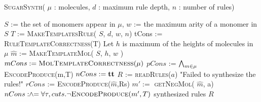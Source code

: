 \begin{algorithm}[t]
  \caption{ \textsc{SugarSynth}( $\mu$ : molecules, $d$ : maximum rule depth, $n$ : number of rules)}
  \label{alg:sugar-synth}
  \begin{algorithmic}[1]
  \State $S$ := the set of monomers appear in $\mu$, $w$ := the maximum arity of a monomer in $S$
  \State $T$ := \textsc{MakeTemplatesRule}( $S$, $d$, $w$, $n$)
  \label{line:createRtemp}
  \State tCons := \textsc{RuleTemplateCorrectness}(T)
  \label{line:ruleCorr}
  \State Let $h$ is maximum of the heights of molecules in $\mu$
  \State $\hat{m}$ := \textsc{MakeTemplateMol}( $S$, $h$, $w$ )
  \label{line:createMtemp}
  \State $mCons := \textsc{MolTemplateCorrectness}(\mu)$
  \label{line:molCorr}
  \State $pCons$ := $\bigwedge_{m \in \mu}$ \textsc{EncodeProduce}(m,T)
    \label{line:molenc}
  \State $nCons := \mathbf{tt}$
  \While{$\ltrue$}
    \label{line:posModel}
    \State $R$ := \textsc{readRules}($a$)
    \label{line:getR}
    \Else
       \State \Return "Failed to synthesize the rules!"
    \EndIf
    \State $rCons$ := \textsc{EncodeProduce}($\hat{m}$,Rs)
    \label{line:consNewR}
        \label{line:negModel}
        \State $m' :=$ \textsc{getNegMol}( $\hat{m}$, a)
        \State $nCons \mathrel{:\hspace{-3pt}\land\hspace{-3pt}=} \forall \tau,cuts. \lnot \textsc{EncodeProduce}(m',T)$
        \label{line:encode-neg-mol}
        \label{line:negCons}
    \Else
       \State \Return synthesized rules $R$
    \EndIf

  \EndWhile
  \end{algorithmic}
\end{algorithm}


